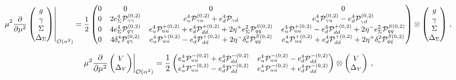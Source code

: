 \begin{widetext}
\begin{equation}
\small
\begin{array}{l}
\displaystyle\left.\mu^2\frac{\partial}{\partial \mu^2}
\begin{pmatrix}
g\\
\gamma\\
\Sigma\\
\Delta_\Sigma
\end{pmatrix}
  \right|_{\mathcal{O}(\alpha^2)} =
 \displaystyle \frac12\begin{pmatrix}
    0 & 0 & 0 & 0 \\
    0 & 2e_\Sigma^4 \mathcal{P}_{\gamma\gamma}^{(0,2)} & e_u^4 \mathcal{P}_{\gamma
      u}^{(0,2)} + e_d^4 \mathcal{P}_{\gamma d} & e_u^4 \mathcal{P}_{\gamma u}^{(0,2)} - e_d^4 \mathcal{P}_{\gamma d}^{(0,2)}\\
    0 & 4 e_\Sigma^4 \mathcal{P}^{(0,2)}_{q\gamma} &
    e_u^4\mathcal{P}_{uu}^{+(0,2)}
    +e_d^4\mathcal{P}_{dd}^{+(0,2)}+2\eta^+e_\Sigma^2\mathcal{P}^{S(0,2)}_{qq} & e_u^4\mathcal{P}_{uu}^{+(0,2)}-e_d^4\mathcal{P}_{dd}^{+(0,2)} + 2\eta^-e_\Sigma^2\mathcal{P}^{S(0,2)}_{qq}\\
    0 & 4 \delta_e^4 \mathcal{P}^{(0,2)}_{q\gamma} & e_u^4\mathcal{P}_{uu}^{+(0,2)}
    -e_d^4\mathcal{P}_{dd}^{+(0,2)}+2\eta^-\delta_e^2
    \mathcal{P}^{S(0,2)}_{qq} & e_u^4\mathcal{P}_{uu}^{+(0,2)}+e_d^4\mathcal{P}_{dd}^{+(0,2)} + 2\eta^+\delta_e^2 \mathcal{P}^{S(0,2)}_{qq}
\end{pmatrix}\otimes
\begin{pmatrix}
g\\
\gamma\\
\Sigma\\
\Delta_\Sigma
\end{pmatrix}\,,
\end{array}
\end{equation}

\begin{equation}
\small
\displaystyle\left.\mu^2\frac{\partial}{\partial \mu^2}
\begin{pmatrix}
V\\
\Delta_V
\end{pmatrix} \right|_{\mathcal{O}(\alpha^2)}= \frac12
\begin{pmatrix}
e_u^4\mathcal{P}_{uu}^{-(0,2)}+e_d^4\mathcal{P}_{dd}^{-(0,2)} & e_u^4\mathcal{P}_{uu}^{-(0,2)}-e_d^4\mathcal{P}_{dd}^{-(0,2)} \\
e_u^4\mathcal{P}_{uu}^{-(0,2)}-e_d^4\mathcal{P}_{dd}^{-(0,2)} & e_u^4\mathcal{P}_{uu}^{-(0,2)}+e_d^4\mathcal{P}_{dd}^{-(0,2)} 
\end{pmatrix}\otimes
\begin{pmatrix}
V\\
\Delta_V
\end{pmatrix}\,,
\end{equation}


\end{widetext}
